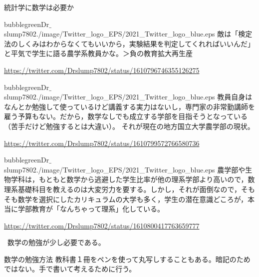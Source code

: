 \begin{SMbox}{統計学に数学は必要か}
    \begin{rightbubbles}{bubblegreen}{Dr$\_$slump7802}{./image/Twitter_logo_EPS/2021_Twitter_logo_blue.eps}
        敵は「検定法のしくみはわからなくてもいいから，実験結果を判定してくれればいいんだ」と平気で学生に語る農学系教員かな。＞負の教育拡大再生産
        \begin{flushright} 
                \small	\url{https://twitter.com/Drslump7802/status/1610796746355126275}
            \end{flushright}    
    \end{rightbubbles}

    \begin{rightbubbles}{bubblegreen}{Dr$\_$slump7802}{./image/Twitter_logo_EPS/2021_Twitter_logo_blue.eps}
        教員自身はなんとか勉強して使っているけど講義する実力はないし，専門家の非常勤講師を雇う予算もない。だから，数学なしでも成立する学部を目指そうとなっている（苦手だけど勉強するとは大違い）。
        それが現在の地方国立大学農学部の現状。
        \begin{flushright} 
            \small	\url{https://twitter.com/Drslump7802/status/1610799572766580736}
        \end{flushright}    
    \end{rightbubbles}

    \begin{rightbubbles}{bubblegreen}{Dr$\_$slump7802}{./image/Twitter_logo_EPS/2021_Twitter_logo_blue.eps}
        農学部や生物学科は，もともと数学から逃避した学生比率が他の理系学部より高いので，数理系基礎科目を教えるのは大変労力を要する。しかし，それが面倒なので，そもそも数学を選択にしたカリキュラムの大学も多く，学生の潜在意識どころが，本当に学部教育が「なんちゃって理系」化している。
        \begin{flushright} 
            \small	\url{https://twitter.com/Drslump7802/status/1610800417763659777}
        \end{flushright}    
    \end{rightbubbles}
\ 
    数学の勉強が少し必要である。
\end{SMbox}

\begin{SMbox}{数学の勉強方法}
    教科書１冊をペンを使って丸写しすることもある。暗記のためではない。手で書いて考えるために行う。
\end{SMbox}
    

